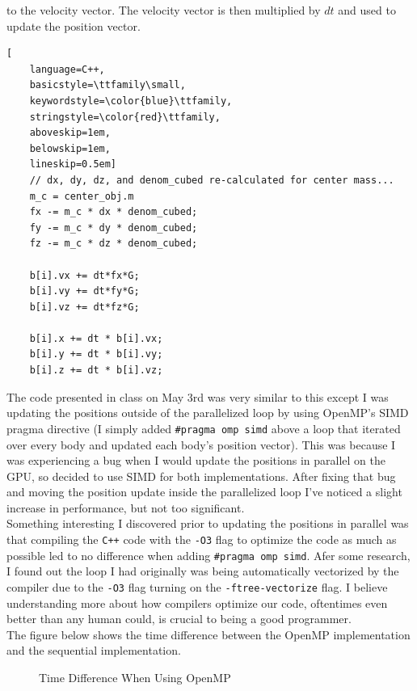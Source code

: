 to the velocity vector. The velocity vector is then multiplied by $dt$ and used to update the position vector.
\begin{lstlisting}[
    language=C++,
    basicstyle=\ttfamily\small,
    keywordstyle=\color{blue}\ttfamily,
    stringstyle=\color{red}\ttfamily,
    aboveskip=1em,
    belowskip=1em,
    lineskip=0.5em]
    // dx, dy, dz, and denom_cubed re-calculated for center mass...
    m_c = center_obj.m
    fx -= m_c * dx * denom_cubed; 
    fy -= m_c * dy * denom_cubed; 
    fz -= m_c * dz * denom_cubed;

    b[i].vx += dt*fx*G;
    b[i].vy += dt*fy*G;
    b[i].vz += dt*fz*G;

    b[i].x += dt * b[i].vx;
    b[i].y += dt * b[i].vy;
    b[i].z += dt * b[i].vz;
\end{lstlisting}
\indent The code presented in class on May 3rd was very similar to this except I was updating the positions outside of the 
parallelized loop by using OpenMP's SIMD pragma directive (I simply added \verb|#pragma omp simd| above a 
loop that iterated over every body and updated each body's position vector). This was because I was experiencing a bug 
when I would update the positions in parallel on the GPU, so decided to use SIMD for both implementations. After fixing that bug 
and moving the position update inside the parallelized loop
I've noticed a slight increase in performance, but not too significant. \\
\indent Something interesting I discovered prior to updating the positions in parallel 
was that compiling the \verb|C++| code with the \verb|-O3| flag to 
optimize the code as much as possible led to no difference when adding \verb|#pragma omp simd|. 
Afer some research, I found out the loop I had originally was being automatically vectorized by the compiler due to the \verb|-O3| 
flag turning on the \verb|-ftree-vectorize| flag. I believe understanding more about how compilers optimize our 
code, oftentimes even better than any human could, is crucial to being a good programmer.\\
\indent The figure below shows the time difference between the OpenMP implementation and the sequential implementation. 
\begin{figure}[H]
    \centering
    \caption{Time Difference When Using OpenMP}
    \label{fig:omp ftw}
\end{figure}

